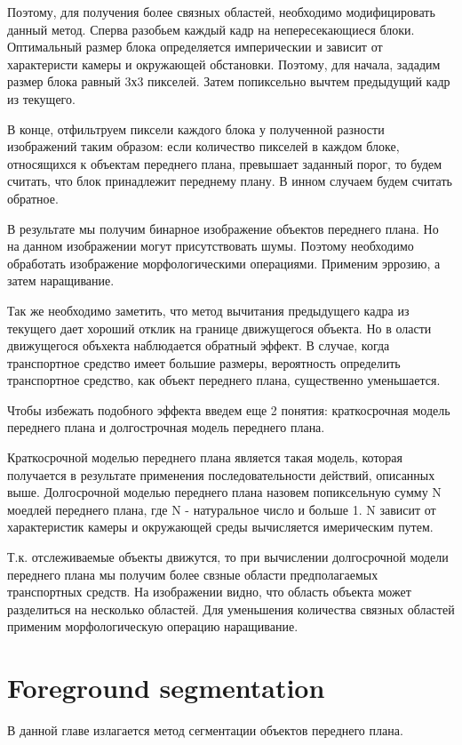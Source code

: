 \documentclass[12pt,a4paper,oneside,titlepage]{article}
\begin{document}
Поэтому, для получения более связных областей, необходимо модифицировать данный метод.
Сперва разобьем каждый кадр на непересекающиеся блоки.
Оптимальный размер блока определяется империческии и зависит от характеристи камеры и окружающей обстановки.
Поэтому, для начала, зададим размер блока равный 3х3 пикселей.
Затем попиксельно вычтем предыдущий кадр из текущего.

В конце, отфильтруем пиксели каждого блока у полученной разности изображений таким образом:
если количество пикселей в каждом блоке, относящихся к объектам переднего плана, превышает заданный порог, то будем считать, что блок принадлежит переднему плану.
В инном случаем будем считать обратное.

В результате мы получим бинарное изображение объектов переднего плана.%
Но на данном изображении могут присутствовать шумы.
Поэтому необходимо обработать изображение морфологическими операциями.
Применим эррозию, а затем наращивание. %





Так же необходимо заметить, что метод вычитания предыдущего кадра из текущего дает хороший отклик на границе движущегося объекта.
Но в оласти движущегося объхекта наблюдается обратный эффект. %
В случае, когда транспортное средство имеет большие размеры, вероятность определить транспортное средство, как объект переднего плана, существенно уменьшается.

Чтобы избежать подобного эффекта введем еще 2 понятия: краткосрочная модель переднего плана и долгострочная модель  переднего плана.

Краткосрочной моделью переднего плана является такая модель, которая получается в результате применения последовательности действий, описанных выше.
Долгосрочной моделью переднего плана назовем попиксельную сумму N моедлей переднего плана, где N - натуральное число и больше 1.
N зависит от характеристик камеры и окружающей среды вычисляется имерическим путем.

Т.к. отслеживаемые объекты движутся, то при вычислении долгосрочной модели переднего плана мы получим более свзные области предполагаемых транспортных средств. %
На изображении видно, что область объекта может разделиться на несколько областей.
Для уменьшения количества связных областей применим морфологическую операцию наращивание.




\newpage
\section*{Foreground segmentation}
В данной главе излагается метод сегментации объектов переднего плана.
\end{document}
